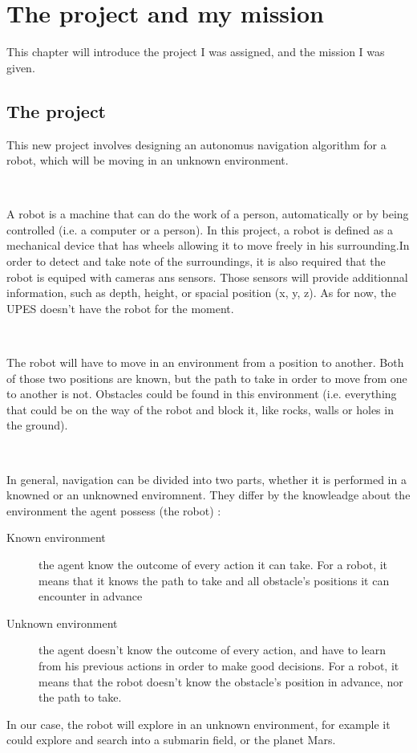 \chapter{The project and my mission}

This chapter will introduce the project I was assigned, and the mission I was given.

\section{The project}

This new project involves designing an autonomus navigation algorithm for a robot, which will be moving in an unknown environment. 

~~

A robot is a machine that can do the work of a person, automatically or by being controlled (i.e. a computer or a person). In this project, a robot is defined as a mechanical device that has wheels allowing it to move freely in his surrounding.In order to detect and take note of the surroundings, it is also required that the robot is equiped with cameras ans sensors. Those sensors will provide additionnal information, such as depth, height, or spacial position (x, y, z). 
As for now, the \gls{UPES} doesn't have the robot for the moment. 

~~

The robot will have to move in an environment from a position to another. Both of those two positions are known, but the path to take in order to move from one to another is not. Obstacles could be found in this environment (i.e. everything that could be on the way of the robot and block it, like rocks, walls or holes in the ground). 

~~

In general, navigation can be divided into two parts, whether it is performed in a knowned or an unknowned enviromnent. They differ by the knowleadge about the environment the agent possess (the robot) \cite{Russell:2010:AIM} : 
\begin{description}
	\item[Known environment] the agent know the outcome of every action it can take. For a robot, it means that it knows the path to take and all obstacle's positions it can encounter in advance 
	\item[Unknown environment] the agent doesn't know the outcome of every action, and have to learn from his previous actions in order to make good decisions. For a robot, it means that the robot doesn't know the obstacle's position in advance, nor the path to take.
\end{description}
In our case, the robot will explore in an unknown environment, for example it could explore and search into a submarin field, or the planet Mars. 

